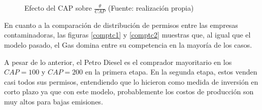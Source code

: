 \begin{figure}[H]
\centering
{}
\caption{{\footnotesize Efecto del CAP sobre $\frac{\theta}{CAP}$ (Fuente: realización propia)}}
\label{rendcapTC2}
\end{figure}

En cuanto a la comparación de distribución de permisos entre las empresas contaminadoras, las figuras \ref{comptc1} y \ref{comptc2} muestras que, al igual que el modelo pasado, el Gas domina entre su competencia en la mayoría de los casos. 
\vspace{2.5mm}

A pesar de lo anterior, el Petro Diesel es el comprador mayoritario en los $CAP= 100$ y $CAP=200$ en la primera etapa. En la segunda etapa, estos venden casi todos sus permisos, entendiendo que lo hicieron como medida de inversión en corto plazo ya que con este modelo, probablemente los costos de producción son muy altos para bajas emisiones.
\vspace{2.5mm}

